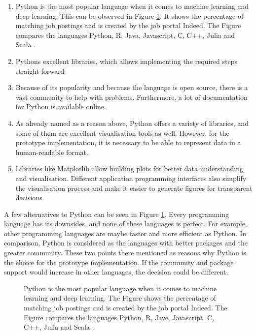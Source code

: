 \begin{enumerate}
	\item Python is the most popular language when it comes to machine learning and deep learning. This can be observed in Figure \ref{fig:52_python_popular}. It shows the percentage of matching job postings and is created by the job portal Indeed. The Figure compares the languages Python, R, Java, Javascript, C, C++, Julia and Scala  \cite{LegacyCo5:online}. 
	
	\item Pythons excellent libraries, which allows implementing the required steps straight forward
	
	\item Because of its popularity and because the language is open source,  there is a vast community to help with problems. Furthermore, a lot of documentation for Python is available online.
	
	\item As already named as a reason above, Python offers a variety of libraries, and some of them are excellent visualisation tools as well. However, for the prototype implementation, it is necessary to be able to represent data in a human-readable format.
	
	\item Libraries like Matplotlib allow building plots for better data understanding and visualisation. Different application programming interfaces also simplify the visualisation process and make it easier to generate figures for transparent decisions.  
\end{enumerate}

A few alternatives to Python can be seen in Figure \ref{fig:52_python_popular}. Every programming language has its downsides, and none of these languages is perfect. For example, other programming languages are maybe faster and more efficient as Python. In comparison, Python is considered as the languages with better packages and the greater community. These two points there mentioned as reasons why Python is the choice for the prototype implementation. If the community and package support would increase in other languages, the decision could be different. 

\begin{figure}[htp]
	\centering
	\caption{Python is the most popular language when it comes to machine learning and deep learning. The Figure shows the percentage of matching job postings and is created by the job portal Indeed. The Figure compares the languages Python, R, Jave, Javascript, C, C++, Julia and Scala \cite{LegacyCo5:online}.}
	\label{fig:52_python_popular}
\end{figure}

